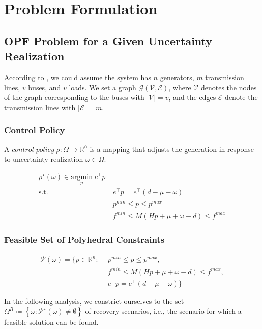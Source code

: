 \documentclass[11pt]{article}
\begin{document}
\section{Problem Formulation}\label{sec:problem}
\subsection{OPF Problem for a Given Uncertainty Realization}
According to \cite{1802.09639}, we could assume the system has $n$ generators, $m$ transmission lines, $v$ buses, and $v$ loads. We set a graph $\mathcal{G}( \mathcal{V}, \mathcal{E})$, where $\mathcal{V}$ denotes the nodes of the graph corresponding to the buses with $\left| \mathcal{V} \right| = v$, and the edges $\mathcal{E}$ denote the transmission lines with $\left| \mathcal{E} \right| = m$.

\subsubsection{Control Policy}
A $control \; policy \; \rho : \Omega\rightarrow \mathbb{R^{n}}$ is a mapping that adjusts the generation in response to uncertainty realization $\omega \in \Omega$. 

\begin{align}\label{eq:opf}
\rho^{\star}\left (  \omega \right )\in \underset{p}{\mathrm{argmin}} \; c^{\top }p \\
\textrm{s.t.} ~ &~ e^{\top }p=e^{\top }\left ( d-\mu -\omega  \right ) \\
~&~ p^{min}\leq p\leq p^{max} \\
~&~ f^{min}\leq M\left ( Hp+\mu +\omega -d \right )  \leq f^{max}
\end{align}

\subsubsection{Feasible Set of Polyhedral Constraints}
\begin{align}\label{eq:opf_poly}
\mathcal{P}\left ( \omega \right ) =  \{ p\in\mathbb{R}^{n}:
~ &~p^{min}\leq p\leq p^{max}, \nonumber \\
~ &~ f^{min}\leq M\left ( Hp+\mu +\omega -d \right )  \leq f^{max}, \nonumber \\
~ &~ e^{\top }p=e^{\top }\left ( d-\mu -\omega  \right )  \}
\end{align}

In the following analysis, we constrict ourselves to the set $\Omega^{R}\coloneqq\left \{ \omega:\mathcal{P}^{\star} \left ( \omega \right )\neq \emptyset \right \}$ of recovery scenarios, i.e., the scenario for which a feasible solution can be found. 
\end{document}
